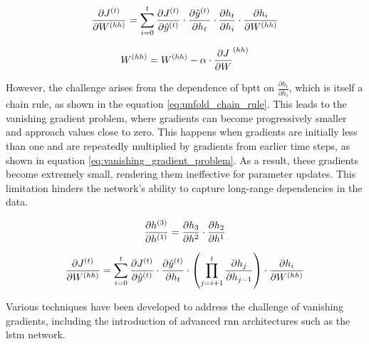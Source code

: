 \begin{equation}
    \centering
    \frac{\partial J^{(t)}}{\partial W^{(hh)}} = \sum_{i=0}^t \frac{\partial J^{(t)}}{\partial \hat{y}^{(t)}} \cdot \frac{\partial \hat{y}^{(t)}}{\partial h_{t}} \cdot \frac{\partial h_{t}}{\partial h_{i}} \cdot \frac{\partial h_{i}}{\partial W^{(hh)}}
    \label{eq:bptt}
\end{equation}

\begin{equation}
    \centering
    W^{(hh)} = W^{(hh)} - \alpha \cdot \frac{\partial J}{\partial W}^{(hh)}
    \label{eq:rnn_weight_update}
\end{equation}

\noindent
However, the challenge arises from the dependence of \gls{bptt} on $\frac{\partial h_t}{\partial h_i}$, which is itself a chain rule, as shown in the equation \ref{eq:unfold_chain_rule}. This leads to the vanishing gradient problem, where gradients can become progressively smaller and approach values close to zero. This happens when gradients are initially less than one and are repeatedly multiplied by gradients from earlier time steps, as shown in equation \ref{eq:vanishing_gradient_problem}. As a result, these gradients become extremely small, rendering them ineffective for parameter updates. This limitation hinders the network's ability to capture long-range dependencies in the data.

\begin{equation}
    \centering
    \frac{\partial h^{(3)}}{\partial h^{(1)}} = \frac{\partial h_{3}}{\partial h^{2}} \cdot \frac{\partial h_{2}}{\partial h^{1}}
    \label{eq:unfold_chain_rule}
\end{equation}

\begin{equation}
    \centering
    \frac{\partial J^{(t)}}{\partial W^{(hh)}} = \sum_{i=0}^t \frac{\partial J^{(t)}}{\partial \hat{y}^{(t)}} \cdot \frac{\partial \hat{y}^{(t)}}{\partial h_{t}} \cdot
    \left(\prod_{j=i+1}^t \frac{\partial h_j}{\partial h_{j-1}} \right)
    \cdot
    \frac{\partial h_{i}}{\partial W^{(hh)}}
    \label{eq:vanishing_gradient_problem}
\end{equation}

\noindent
Various techniques have been developed to address the challenge of vanishing gradients, including the introduction of advanced \gls{rnn} architectures such as the \gls{lstm} network.